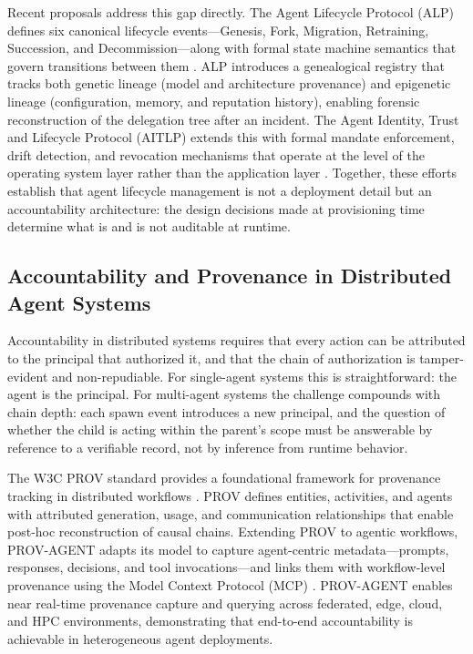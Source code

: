 Recent proposals address this gap directly. The Agent Lifecycle Protocol (ALP) defines six canonical lifecycle events---Genesis, Fork, Migration, Retraining, Succession, and Decommission---along with formal state machine semantics that govern transitions between them \cite{agent-lifecycle-protocol}. ALP introduces a genealogical registry that tracks both genetic lineage (model and architecture provenance) and epigenetic lineage (configuration, memory, and reputation history), enabling forensic reconstruction of the delegation tree after an incident. The Agent Identity, Trust and Lifecycle Protocol (AITLP) extends this with formal mandate enforcement, drift detection, and revocation mechanisms that operate at the level of the operating system layer rather than the application layer \cite{draft-larsson-aitlp}. Together, these efforts establish that agent lifecycle management is not a deployment detail but an accountability architecture: the design decisions made at provisioning time determine what is and is not auditable at runtime.

\subsection{Accountability and Provenance in Distributed Agent Systems}
\label{sec:accountability-provenance}

Accountability in distributed systems requires that every action can be attributed to the principal that authorized it, and that the chain of authorization is tamper-evident and non-repudiable. For single-agent systems this is straightforward: the agent is the principal. For multi-agent systems the challenge compounds with chain depth: each spawn event introduces a new principal, and the question of whether the child is acting within the parent's scope must be answerable by reference to a verifiable record, not by inference from runtime behavior.

The W3C PROV standard provides a foundational framework for provenance tracking in distributed workflows \cite{provw3c}. PROV defines entities, activities, and agents with attributed generation, usage, and communication relationships that enable post-hoc reconstruction of causal chains. Extending PROV to agentic workflows, PROV-AGENT adapts its model to capture agent-centric metadata---prompts, responses, decisions, and tool invocations---and links them with workflow-level provenance using the Model Context Protocol (MCP) \cite{prov-agent}. PROV-AGENT enables near real-time provenance capture and querying across federated, edge, cloud, and HPC environments, demonstrating that end-to-end accountability is achievable in heterogeneous agent deployments.

